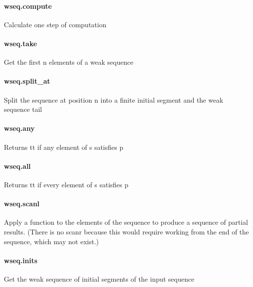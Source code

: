 \documentclass{article}
\begin{document}
\paragraph{wseq.compute}
\par
Calculate one step of computation
\paragraph{wseq.take}
\par
Get the first 
\colorbox[RGB]{253,246,227}{{{{\color[RGB]{101, 123, 131} n }}}} elements of a weak sequence
\paragraph{wseq.split\_at}
\par
Split the sequence at position 
\colorbox[RGB]{253,246,227}{{{{\color[RGB]{101, 123, 131} n }}}} into a finite initial segment
and the weak sequence tail
\paragraph{wseq.any}
\par
Returns 
\colorbox[RGB]{253,246,227}{{{{\color[RGB]{101, 123, 131} tt }}}} if any element of 
\colorbox[RGB]{253,246,227}{{{{\color[RGB]{101, 123, 131} s }}}} satisfies 
\colorbox[RGB]{253,246,227}{{{{\color[RGB]{101, 123, 131} p }}}}\paragraph{wseq.all}
\par
Returns 
\colorbox[RGB]{253,246,227}{{{{\color[RGB]{101, 123, 131} tt }}}} if every element of 
\colorbox[RGB]{253,246,227}{{{{\color[RGB]{101, 123, 131} s }}}} satisfies 
\colorbox[RGB]{253,246,227}{{{{\color[RGB]{101, 123, 131} p }}}}\paragraph{wseq.scanl}
\par
Apply a function to the elements of the sequence to produce a sequence
of partial results. (There is no 
\colorbox[RGB]{253,246,227}{{{{\color[RGB]{101, 123, 131} scanr }}}} because this would require
working from the end of the sequence, which may not exist.)
\paragraph{wseq.inits}
\par
Get the weak sequence of initial segments of the input sequence
\end{document}
